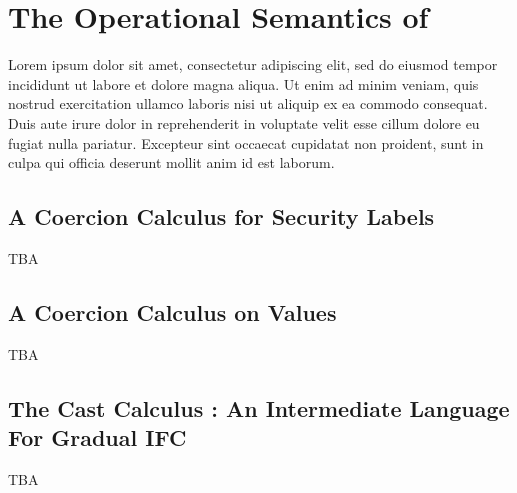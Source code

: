\chapter{The Operational Semantics of \Surface}
\label{ch:sem}

Lorem ipsum dolor sit amet, consectetur adipiscing elit, sed do eiusmod tempor incididunt ut labore et dolore magna aliqua. Ut enim ad minim veniam, quis nostrud exercitation ullamco laboris nisi ut aliquip ex ea commodo consequat. Duis aute irure dolor in reprehenderit in voluptate velit esse cillum dolore eu fugiat nulla pariatur. Excepteur sint occaecat cupidatat non proident, sunt in culpa qui officia deserunt mollit anim id est laborum.

\section{A Coercion Calculus for Security Labels}

TBA

\section{A Coercion Calculus on Values}

TBA

\section{The Cast Calculus \CC: An Intermediate Language For Gradual IFC}

TBA
